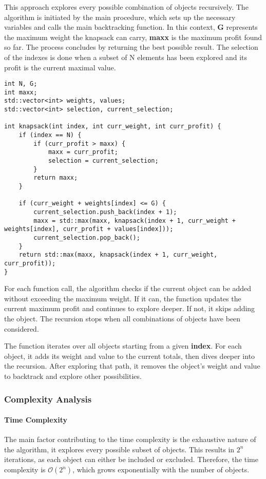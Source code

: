 \documentclass[runningheads]{llncs}
\begin{document}
This approach explores every possible combination of objects recursively. The algorithm is initiated
by the main procedure, which sets up the necessary variables and calls the main backtracking
function. In this context, \textbf{G} represents the maximum weight the knapsack can carry, 
\textbf{maxx} is the maximum profit found so far. The process concludes by returning the best 
possible result. The selection of the indexes is done when a subset of N elements has been explored
and its profit is the current maximal value.


\begin{lstlisting}
int N, G;
int maxx;
std::vector<int> weights, values;
std::vector<int> selection, current_selection;

int knapsack(int index, int curr_weight, int curr_profit) {
	if (index == N) {
		if (curr_profit > maxx) {
			maxx = curr_profit;
			selection = current_selection;
		}
		return maxx;
	}

	if (curr_weight + weights[index] <= G) {
		current_selection.push_back(index + 1);
		maxx = std::max(maxx, knapsack(index + 1, curr_weight + weights[index], curr_profit + values[index]));
		current_selection.pop_back();
	}
	return std::max(maxx, knapsack(index + 1, curr_weight, curr_profit));
}
\end{lstlisting}

For each function call, the algorithm checks if the current object can be added without exceeding 
the maximum weight. If it can, the function updates the current maximum profit and continues to 
explore deeper. If not, it skips adding the object. The recursion stops when all combinations of objects have been considered.

The function iterates over all objects starting from a given \textbf{index}. For each object, it 
adds its weight and value to the current totals, then dives deeper into the recursion. After 
exploring that path, it removes the object's weight and value to backtrack and explore other 
possibilities.

\subsubsection{Complexity Analysis}
\paragraph{Time Complexity}
The main factor contributing to the time complexity is the exhaustive nature of the algorithm, it 
explores every possible subset of objects. This results in \( 2^n \) iterations, as each object can 
either be included or excluded. Therefore, the time complexity is $\mathcal{O}(2^n)$, which grows exponentially with the number of objects.
\end{document}
